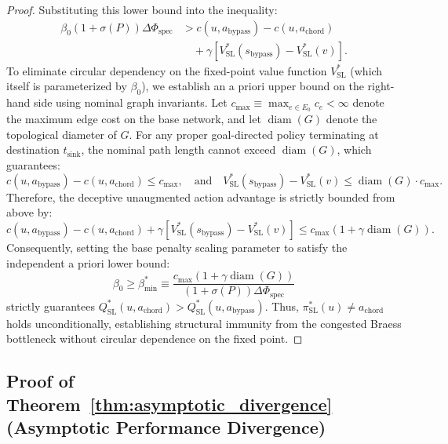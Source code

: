 \documentclass[11pt,a4paper]{article}
\begin{document}
\begin{proof}
Substituting this lower bound into the inequality:
\begin{equation}
\begin{split}
\beta_0 (1 + \sigma(P)) \Delta \Phi_{\text{spec}} &> c(u, a_{\text{bypass}}) - c(u, a_{\text{chord}}) \\
&\quad + \gamma \left[ V_{\text{SL}}^*(s_{\text{bypass}}) - V_{\text{SL}}^*(v) \right].
\end{split}
\end{equation}
To eliminate circular dependency on the fixed-point value function $V_{\text{SL}}^*$ (which itself is parameterized by $\beta_0$), we establish an a priori upper bound on the right-hand side using nominal graph invariants. Let $c_{\max} \equiv \max_{e \in E_0} c_e < \infty$ denote the maximum edge cost on the base network, and let $\operatorname{diam}(G)$ denote the topological diameter of $G$. For any proper goal-directed policy terminating at destination $t_{\text{sink}}$, the nominal path length cannot exceed $\operatorname{diam}(G)$, which guarantees:
\begin{equation}
c(u, a_{\text{bypass}}) - c(u, a_{\text{chord}}) \le c_{\max}, \quad \text{and} \quad V_{\text{SL}}^*(s_{\text{bypass}}) - V_{\text{SL}}^*(v) \le \operatorname{diam}(G) \cdot c_{\max}.
\end{equation}
Therefore, the deceptive unaugmented action advantage is strictly bounded from above by:
\begin{equation}
c(u, a_{\text{bypass}}) - c(u, a_{\text{chord}}) + \gamma \left[ V_{\text{SL}}^*(s_{\text{bypass}}) - V_{\text{SL}}^*(v) \right] \le c_{\max} \left( 1 + \gamma \operatorname{diam}(G) \right).
\end{equation}
Consequently, setting the base penalty scaling parameter to satisfy the independent a priori lower bound:
\begin{equation}
\beta_0 \ge \beta_{\min}^* \equiv \frac{c_{\max} \left( 1 + \gamma \operatorname{diam}(G) \right)}{(1 + \sigma(P)) \Delta \Phi_{\text{spec}}}
\end{equation}
strictly guarantees $Q_{\text{SL}}^*(u, a_{\text{chord}}) > Q_{\text{SL}}^*(u, a_{\text{bypass}})$. Thus, $\pi_{\text{SL}}^*(u) \ne a_{\text{chord}}$ holds unconditionally, establishing structural immunity from the congested Braess bottleneck without circular dependence on the fixed point.
\end{proof}

\subsection{Proof of Theorem~\ref{thm:asymptotic_divergence} (Asymptotic Performance Divergence)}
\label{subsec:proof_thm4}
\end{document}
